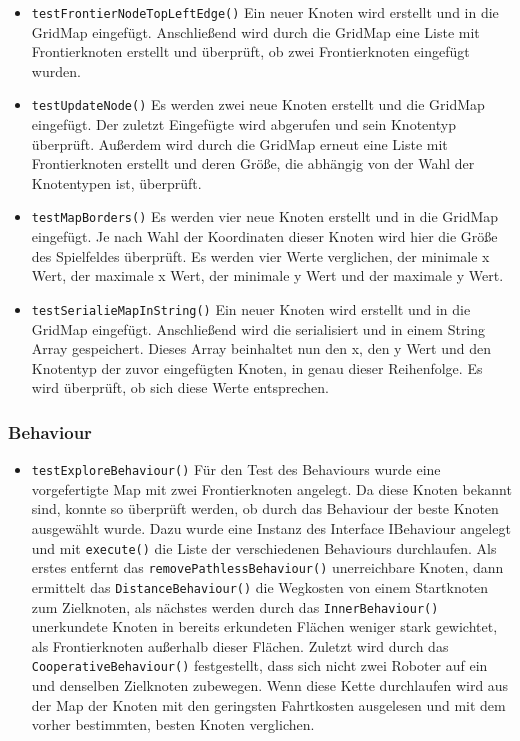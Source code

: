 \documentclass[10pt,a4paper]{article}
\begin{document}
\begin{itemize}
				\item \texttt{testFrontierNodeTopLeftEdge()} Ein neuer Knoten wird erstellt und in die GridMap eingefügt. Anschließend wird durch die GridMap eine Liste mit 									Frontierknoten erstellt und überprüft, ob zwei Frontierknoten eingefügt wurden.
				\item \texttt{testUpdateNode()} Es werden zwei neue Knoten erstellt und die GridMap eingefügt. Der zuletzt Eingefügte wird abgerufen und sein Knotentyp überprüft. Außerdem 					wird durch die GridMap erneut eine Liste mit Frontierknoten erstellt und deren Größe, die abhängig von der Wahl der Knotentypen ist, überprüft.
				\item \texttt{testMapBorders()} Es werden vier neue Knoten erstellt und in die GridMap eingefügt. Je nach Wahl der Koordinaten dieser Knoten wird hier die Größe des 							Spielfeldes überprüft. Es werden vier Werte verglichen, der minimale x Wert, der maximale x Wert, der minimale y Wert und der maximale y Wert.
				\item \texttt{testSerialieMapInString()} Ein neuer Knoten wird erstellt und in die GridMap eingefügt. Anschließend wird die serialisiert und in einem String Array 								gespeichert. Dieses Array beinhaltet nun den x, den y Wert und den Knotentyp der zuvor eingefügten Knoten, in genau dieser Reihenfolge. Es wird überprüft, ob sich diese Werte 				entsprechen.
			\end{itemize}
			
			\subsubsection{Behaviour}
			\begin{itemize}
				\item \texttt{testExploreBehaviour()} 
				Für den Test des Behaviours wurde eine vorgefertigte Map mit zwei Frontierknoten angelegt. Da diese Knoten bekannt sind, konnte so überprüft werden, ob durch das Behaviour 					der beste Knoten ausgewählt wurde. Dazu wurde eine Instanz des Interface IBehaviour angelegt und mit \texttt{execute()} die Liste der verschiedenen Behaviours durchlaufen. 					Als erstes entfernt das \texttt{removePathlessBehaviour()} unerreichbare Knoten, dann ermittelt das \texttt{DistanceBehaviour()} die Wegkosten von einem Startknoten zum 						Zielknoten, als nächstes werden durch das \texttt{InnerBehaviour()} unerkundete Knoten in bereits erkundeten Flächen weniger stark gewichtet, als Frontierknoten außerhalb 						dieser Flächen. Zuletzt wird durch das \texttt{CooperativeBehaviour()} festgestellt, dass sich nicht zwei Roboter auf ein und denselben Zielknoten zubewegen. Wenn diese Kette 				durchlaufen wird aus der Map der Knoten mit den geringsten Fahrtkosten ausgelesen und mit dem vorher bestimmten, besten Knoten verglichen. 
			\end{itemize}
			
\end{document}
